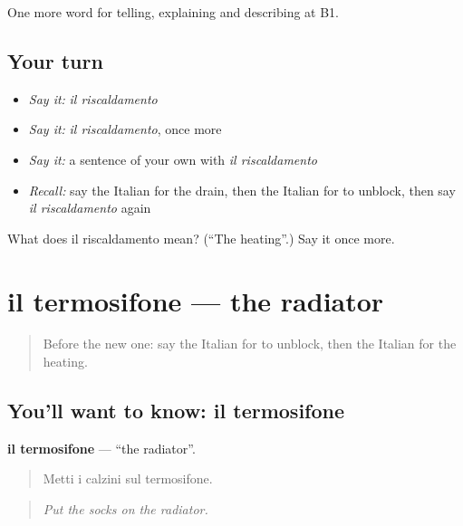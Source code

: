\begin{grammarlens}[title={What you've built}]
One more word for telling, explaining and describing at B1.
\end{grammarlens}

\subsection*{Your turn}
\begin{itemize}
\raggedright
  \item \emph{Say it:} \emph{il riscaldamento}
  \item \emph{Say it:} \emph{il riscaldamento}, once more
  \item \emph{Say it:} a sentence of your own with \emph{il riscaldamento}
  \item \emph{Recall:} say the Italian for the drain, then the Italian for to unblock, then say \emph{il riscaldamento} again
\end{itemize}

\begin{tcolorbox}[breakable,colback=teal!4,colframe=teal!35!black,title={Before you move on}]
What does il riscaldamento mean? (\textquotedblleft{}The heating\textquotedblright{}.) Say it once more.
\end{tcolorbox}
\section[il termosifone]{il termosifone — the radiator}

\label{lesson:IT-C435-termosifone}



\begin{quote}
Before the new one: say the Italian for to unblock, then the Italian for the heating.
\end{quote}

\subsection*{You'll want to know: il termosifone}
\textbf{il termosifone} — \textquotedblleft{}the radiator\textquotedblright{}.

\begin{quote}
Metti i calzini sul termosifone.
\end{quote}

\begin{quote}
\emph{Put the socks on the radiator.}
\end{quote}

